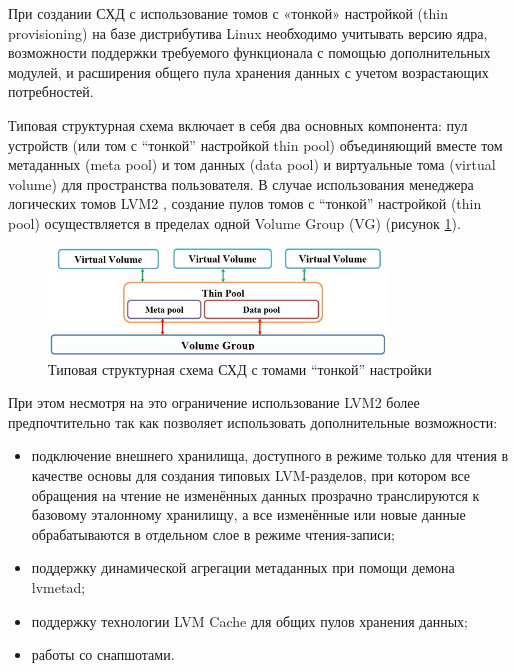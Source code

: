 \documentclass[10pt, a5paper]{article}
\begin{document}
При создании СХД с использование томов с «тонкой» настройкой (thin provisioning) \cite{bib3} на базе дистрибутива Linux необходимо учитывать версию ядра, возможности поддержки требуемого функционала с помощью дополнительных модулей, и  расширения общего пула хранения данных с учетом возрастающих потребностей.

Типовая структурная схема включает в себя два основных компонента: пул устройств (или том с ``тонкой'' настройкой thin pool) объединяющий вместе том метаданных (meta pool) и том данных (data pool)  и виртуальные тома (virtual volume) для пространства пользователя. В случае использования менеджера логических томов LVM2 \cite{bib4}, создание пулов томов с ``тонкой'' настройкой (thin pool) осуществляется в пределах одной Volume Group (VG) (рисунок \ref{02:klyga:fig2}).

\begin{center}
\begin{figure}[h!]
  \centering
  \includegraphics[width=9cm]{02_klyga_fig2}
  \caption{Типовая структурная схема СХД с томами ``тонкой'' настройки}
  \label{02:klyga:fig2}
\end{figure}
\end{center} 

При этом несмотря на это ограничение использование LVM2 более предпочтительно так как позволяет использовать дополнительные возможности:

\begin{itemize}
  \item подключение внешнего хранилища, доступного в режиме только для чтения в качестве основы для создания типовых LVM-разделов, при котором все обращения на чтение не изменённых данных прозрачно транслируются к базовому эталонному хранилищу, а все изменённые или новые данные обрабатываются в отдельном слое в режиме чтения-записи;
  \item поддержку динамической агрегации метаданных при помощи демона lvmetad;
  \item поддержку технологии LVM Cache для общих пулов хранения данных;
  \item работы со снапшотами.
\end{itemize}
\end{document}
